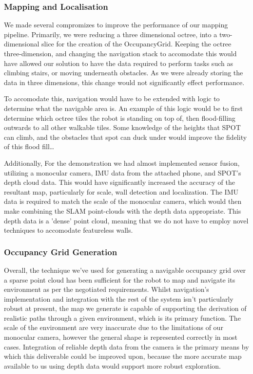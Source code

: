 \documentclass[10pt,english]{article}
\begin{document}
\subsubsection*{Mapping and Localisation}

We made several compromizes to improve the performance of our mapping pipeline. Primarily, we were reducing a three dimensional octree, into a two-dimensional slice for the creation of the OccupancyGrid. Keeping the octree three-dimension, and changing the navigation stack to accomodate this would have allowed our solution to have the data required to perform tasks such as climbing stairs, or moving underneath obstacles. As we were already storing the data in three dimensions, this change would not significantly effect performance.

To accomodate this, navigation would have to be extended with logic to determine what the navigable area is. An example of this logic would be to first determine which octree tiles the robot is standing on top of, then flood-filling outwards to all other walkable tiles. Some knowledge of the heights that SPOT can climb, and the obstacles that spot can duck under would improve the fidelity of this flood fill\dots

Additionally, For the demonstration we had almost implemented sensor fusion, utilizing a monocular camera, IMU data from the attached phone, and SPOT's depth cloud data. This would have significantly increased the accuracy of the resultant map, particularly for scale, wall detection and localization. The IMU data is required to match the scale of the monocular camera, which would then make combining the SLAM point-clouds with the depth data appropriate. This depth data is a 'dense' point cloud, meaning that we do not have to employ novel techniques to accomodate featureless walls.

\subsubsection*{Occupancy Grid Generation}

Overall, the technique we've used for generating a navigable occupancy grid over a sparse point cloud has been sufficient for the robot to map and navigate its environment as per the negotiated requirements. Whilst navigation's implementation and integration with the rest of the system isn't particularly robust at present, the map we generate is capable of supporting the derivation of realistic paths through a given environment, which is its primary function. The scale of the environment are very inaccurate due to the limitations of our monocular camera, however the general shape is represented correctly in most cases. Integration of reliable depth data from the camera is the primary means by which this deliverable could be improved upon, because the more accurate map available to us using depth data would support more robust exploration.
\end{document}
